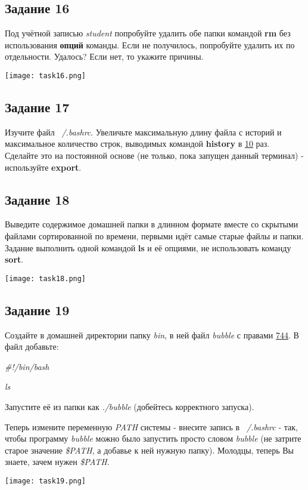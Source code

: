 \documentclass[12pt, a4paper]{report}
\begin{document}
			\subsection*{Задание 16}
			Под учётной записью \textit{student} попробуйте удалить обе папки командой \textbf{rm} без использования \textbf{опций} команды. Если не получилось, попробуйте удалить их по отдельности. Удалось? Если нет, то укажите причины.
			\lstset{style=mystyle}
			
			\begin{center}
				\texttt{[image: task16.png]}
			\end{center}

			\subsection*{Задание 17}
			Изучите файл \textit{~/.bashrc}. Увеличьте максимальную длину файла с историй и максимальное количество строк, выводимых командой \textbf{history} в \underline{10} раз. Сделайте это на постоянной основе (не только, пока запущен данный терминал) - используйте \textbf{export}.
	
			\subsection*{Задание 18}
			Выведите содержимое домашней папки в длинном формате вместе со скрытыми файлами сортированной по времени, первыми идёт самые старые файлы и папки. Задание выполнить одной командой \textbf{ls} и её опциями, не использовать команду \textbf{sort}.
			\lstset{style=mystyle}
			
			\begin{center}
				\texttt{[image: task18.png]}
			\end{center}

			\subsection*{Задание 19}
			Создайте в домашней директории папку \textit{bin}, в ней файл \textit{bubble} с правами \underline{744}. В файл добавьте: \par
			\textit{\#!/bin/bash} \par
			\textit{ls} \par
			Запустите её из папки как \textit{./bubble} (добейтесь корректного запуска). \par
			Теперь измените переменную \textit{PATH} системы - внесите запись в \textit{~/.bashrc} - так, чтобы программу \textit{bubble} можно было запустить просто словом \textit{bubble} (не затрите старое значение \textit{\$PATH}, а добавье к ней нужную папку). Молодцы, теперь Вы знаете, зачем нужен \textit{\$PATH}.
			\lstset{style=mystyle}
			
			\begin{center}
				\texttt{[image: task19.png]}
			\end{center}
\end{document}
